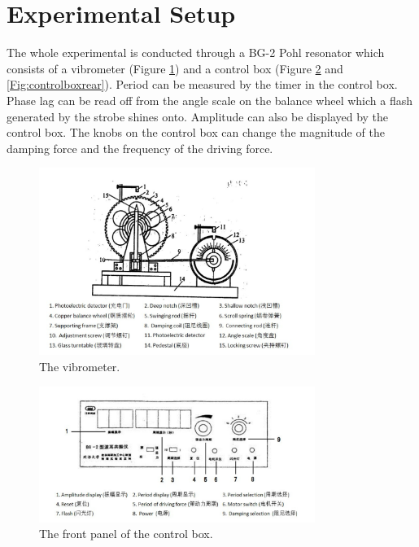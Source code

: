 \documentclass[a4paper]{article}
\begin{document}
\section{Experimental Setup} \label{Sec:exset}

The whole experimental is conducted through a BG-2 Pohl resonator which consists of a vibrometer (Figure \ref{Fig:vibrometer}) and a control box (Figure \ref{Fig:controlboxfront} and \ref{Fig:controlboxrear}). Period can be measured by the timer in the control box. Phase lag can be read off from the angle scale on the balance wheel which a flash generated by the strobe shines onto. Amplitude can also be displayed by the control box. The knobs on the control box can change the magnitude of the damping force and the frequency of the driving force.

\begin{figure}[htbp]
\begin{center}
\includegraphics[width=0.8\textwidth]{vibrometer.png}
\caption{The vibrometer.}\label{Fig:vibrometer}
\end{center}
\end{figure}

\begin{figure}[htbp]
\begin{center}
\includegraphics[width=0.8\textwidth]{controlboxfront.png}
\caption{The front panel of the control box.}\label{Fig:controlboxfront}
\end{center}
\end{figure}
\end{document}
